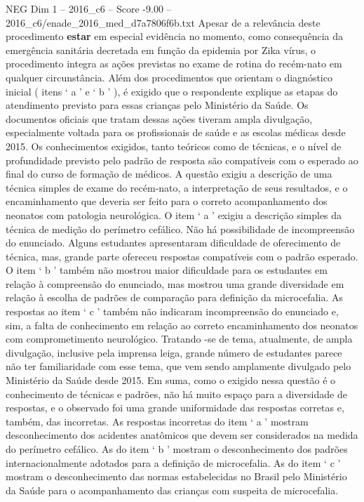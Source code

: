 \begin{textsample}{NEG Dim 1 – 2016\_c6 – Score -9.00 – 2016\_c6/enade\_2016\_med\_d7a7806f6b.txt}
Apesar de a relevância deste procedimento \textbf{estar} em especial evidência no momento, como consequência da emergência sanitária decretada em função da epidemia por Zika vírus, o procedimento integra as ações previstas no exame de rotina do recém-nato em qualquer circunstância.
Além dos procedimentos que orientam o diagnóstico inicial ( itens ‘ a ’ e ‘ b ’ ), é exigido que o respondente explique as etapas do atendimento previsto para essas crianças pelo Ministério da Saúde.
Os documentos oficiais que tratam dessas ações tiveram ampla divulgação, especialmente voltada para os profissionais de saúde e as escolas médicas desde 2015.
Os conhecimentos exigidos, tanto teóricos como de técnicas, e o nível de profundidade previsto pelo padrão de resposta são compatíveis com o esperado ao final do curso de formação de médicos.
A questão exigiu a descrição de uma técnica simples de exame do recém-nato, a interpretação de seus resultados, e o encaminhamento que deveria ser feito para o correto acompanhamento dos neonatos com patologia neurológica.
O item ‘ a ’ exigiu a descrição simples da técnica de medição do perímetro cefálico.
Não há possibilidade de incompreensão do enunciado.
Alguns estudantes apresentaram dificuldade de oferecimento de técnica, mas, grande parte ofereceu respostas compatíveis com o padrão esperado.
O item ‘ b ’ também não mostrou maior dificuldade para os estudantes em relação à compreensão do enunciado, mas mostrou uma grande diversidade em relação à escolha de padrões de comparação para definição da microcefalia.
As respostas ao item ‘ c ’ também não indicaram incompreensão do enunciado e, sim, a falta de conhecimento em relação ao correto encaminhamento dos neonatos com comprometimento neurológico.
Tratando -se de tema, atualmente, de ampla divulgação, inclusive pela imprensa leiga, grande número de estudantes parece não ter familiaridade com esse tema, que vem sendo amplamente divulgado pelo Ministério da Saúde desde 2015.
Em suma, como o exigido nessa questão é o conhecimento de técnicas e padrões, não há muito espaço para a diversidade de respostas, e o observado foi uma grande uniformidade das respostas corretas e, também, das incorretas.
As respostas incorretas do item ‘ a ’ mostram desconhecimento dos acidentes anatômicos que devem ser considerados na medida do perímetro cefálico.
As do item ‘ b ’ mostram o desconhecimento dos padrões internacionalmente adotados para a definição de microcefalia.
As do item ‘ c ’ mostram o desconhecimento das normas estabelecidas no Brasil pelo Ministério da Saúde para o acompanhamento das crianças com suspeita de microcefalia.

\end{textsample}
